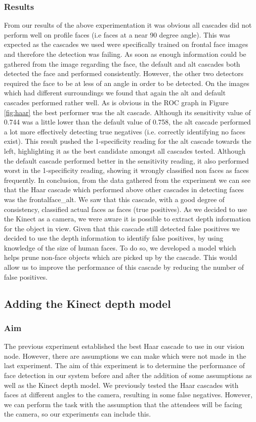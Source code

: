\documentclass[conference]{IEEEtran}
\begin{document}
\subsubsection{Results}
From our results of the above experimentation it was obvious all cascades did not perform well on profile faces (i.e faces at a near 90 degree angle). This was expected as the cascades we used were specifically trained on frontal face images and therefore the detection was failing. As soon as enough information could be gathered from the image regarding the face, the default and alt cascades both detected the face and performed consistently. However, the other two detectors required the face to be at less of an angle in order to be detected. On the images which had different surroundings we found that again the alt and default cascades performed rather well. As is obvious in the ROC graph in Figure \ref{fig:haar} the best performer was the alt cascade. Although its sensitivity value of 0.744 was a little lower than the default value of 0.758, the alt cascade performed a lot more effectively detecting true negatives (i.e. correctly identifying no faces exist). This result pushed the 1-specificity reading for the alt cascade towards the left, highlighting it as the best candidate amongst all cascades tested. Although the default cascade performed better in the sensitivity reading, it also performed worst in the 1-specificity reading, showing it wrongly classified non faces as faces frequently. In conclusion, from the data gathered from the experiment we can see that the Haar cascade which performed above other cascades in detecting faces was the frontalface\_alt. We saw that this cascade, with a good degree of consistency, classified actual faces as faces (true positives). As we decided to use the Kinect as a camera, we were aware it is possible to extract depth information for the object in view. Given that this cascade still detected false positives we decided to use the depth information to identify false positives, by using knowledge of the size of human faces. To do so, we developed a model which helps prune non-face objects which are picked up by the cascade. This would allow us to improve the performance of this cascade by reducing the number of false positives.
\subsection{Adding the Kinect depth model}
\subsubsection{Aim}
The previous experiment established the best Haar cascade to use in our vision node. However, there are assumptions we can make which were not made in the last experiment. The aim of this experiment is to determine the performance of face detection in our system before and after the addition of some assumptions as well as the Kinect depth model.
We previously tested the Haar cascades with faces at different angles to the camera, resulting in some false negatives. However, we can perform the task with the assumption that the attendees will be facing the camera, so our experiments can include this.
\end{document}
